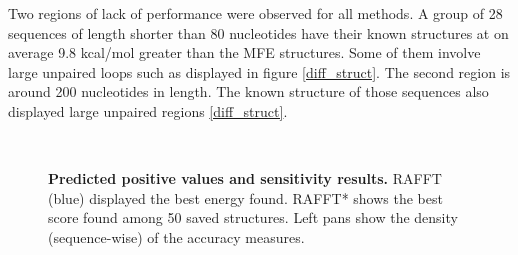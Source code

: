 \documentclass[a4paper,12pt]{article}
\begin{document}
{{Two regions of lack of performance were observed for all methods. A group of 28
sequences of length shorter than 80 nucleotides have their known structures at
on average 9.8 kcal/mol greater than the MFE structures. Some of them involve
large unpaired loops such as displayed in figure \ref{diff_struct}. The second
region is around 200 nucleotides in length. The known structure of those
sequences also displayed large unpaired regions \ref{diff_struct}.

\begin{figure}[!ht]
  \centering
  \\
  \caption{\textbf{Predicted positive values and sensitivity
      results\label{perf_fig}.} RAFFT (blue) displayed the best energy found.
    RAFFT* shows the best score found among 50 saved structures. Left pans show
    the density (sequence-wise) of the accuracy measures.}
\end{figure}

}}
\end{document}
